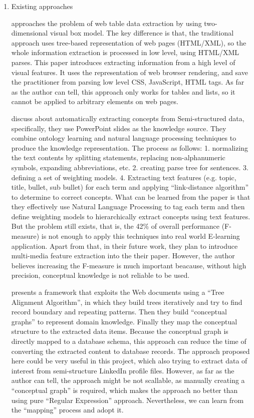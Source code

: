 \begin{enumerate}
\item
Existing approaches

\cite{gatterbauer2007} approaches the problem of web table data extraction by using two-dimensional visual box model. The key difference is that, the traditional approach uses tree-based representation of web pages (HTML/XML), so the whole information extraction is processed in low level, using HTML/XML parses. This paper introduces extracting information from a high level of visual features. It uses the representation of web browser rendering, and save the practitioner from parsing low level CSS, JavaScript, HTML tags. As far as the author can tell, this approach only works for tables and lists, so it cannot be applied to arbitrary elements on web pages.

\cite{atapattu2012} discuss about automatically extracting concepts from Semi-structured data, specifically, they use PowerPoint slides as the knowledge source. They combine ontology learning and natural language processing techniques to produce the knowledge representation. The process as follows: 1. normalizing the text contents by splitting statements, replacing non-alphanumeric symbols, expanding abbreviations, etc. 2. creating parse tree for sentences. 3. defining a set of weighting models. 4. Extracting text features (e.g. topic, title, bullet, sub bullet) for each term and applying ``link-distance algorithm'' to determine to correct concepts. What can be learned from the paper is that they effectively use Natural Language Processing to tag each term and then define weighting models to hierarchically extract concepts using text features. But the problem still exists, that is, the 42\% of overall performance (F-measure) is not enough to apply this techniques into real world E-learning application. Apart from that, in their future work, they plan to introduce multi-media feature extraction into the their paper. However, the author believes increasing the F-measure is much important beacause, without high precision, conceptual knowledge is not reliable to be used.

\cite{hemnani2002} presents a framework that exploits the Web documents using a ``Tree Alignment Algorithm'', in which they build trees iteratively and try to find record boundary and repeating patterns. Then they build ``conceptual graphs'' to represent domain knowledge. Finally they map the conceptual structure to the extracted data items. Because the conceptual graph is directly mapped to a database schema, this approach can reduce the time of converting the extracted content to database records. The approach proposed here could be very useful in this project, which also trying to extract data of interest from semi-structure LinkedIn profile files. However, as far as the author can tell, the approach might be not scallable, as manually creating a ``conceptual graph'' is required, which makes the approach no better than using pure ``Regular Expression'' approach. Nevertheless, we can learn from the ``mapping'' process and adopt it.


\end{enumerate}
